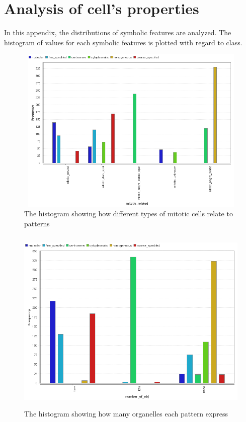 
\chapter{Analysis of cell's properties} %

\label{AppendixA} %


In this appendix, the distributions of symbolic features are analyzed. The histogram of values for each symbolic features is plotted with regard to class.



\begin{figure}
	\begin{center}
		\includegraphics[width=14cm, height=8cm]{Figures/AppendixA/mitotic_related}
		\caption{The histogram showing how different types of mitotic cells relate to patterns}
	\end{center}
\end{figure}

\begin{figure}
	\begin{center}
		\includegraphics[width=14cm, height=9cm]{Figures/AppendixA/number_of_organelles}
		\caption{The histogram showing how many organelles each pattern express}
	\end{center}
\end{figure}

